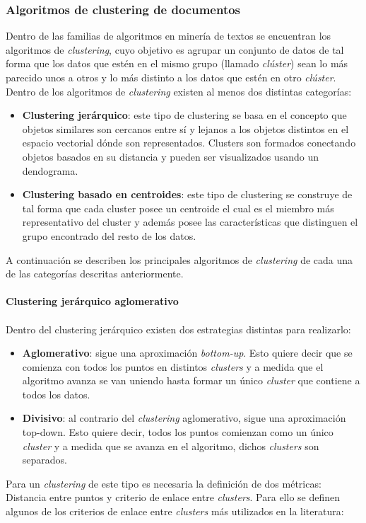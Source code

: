 \subsubsection{Algoritmos de clustering de documentos}
    Dentro de las familias de algoritmos en minería de textos se encuentran los algoritmos de \textit{clustering}, cuyo objetivo es agrupar un conjunto de datos de tal forma que los datos que estén en el mismo grupo (llamado \textit{clúster}) sean lo más parecido unos a otros y lo más distinto a los datos que estén en otro \textit{clúster}. Dentro de los algoritmos de \textit{clustering} existen al menos dos distintas categorías:
    \begin{itemize}
        \item \textbf{Clustering jerárquico}: este tipo de clustering se basa en el concepto que objetos similares son cercanos entre sí y lejanos a los objetos distintos en el espacio vectorial dónde son representados. Clusters son formados conectando objetos basados en su distancia y pueden ser visualizados usando un dendograma.
        
        \item \textbf{Clustering basado en centroides}: este tipo de clustering se construye de tal forma que cada cluster posee un centroide el cual es el miembro más representativo del cluster y además posee las características que distinguen el grupo encontrado del resto de los datos.
    \end{itemize}
    A continuación se describen los principales algoritmos de \textit{clustering} de cada una de las categorías descritas anteriormente.
\paragraph{Clustering jerárquico aglomerativo} 
\paragraph*{}Dentro del clustering jerárquico existen dos estrategias distintas para realizarlo:
    \begin{itemize}
        \item \textbf{Aglomerativo}: sigue una aproximación \textit{bottom-up}. Esto quiere decir que se comienza con todos los puntos en distintos \textit{clusters} y a medida que el algoritmo avanza se van uniendo hasta formar un único \textit{cluster} que contiene a todos los datos.
        \item \textbf{Divisivo}: al contrario del \textit{clustering} aglomerativo, sigue una aproximación top-down. Esto quiere decir, todos los puntos comienzan como un único \textit{cluster} y a medida que se avanza en el algoritmo, dichos \textit{clusters} son separados.
    \end{itemize}
    Para un \textit{clustering} de este tipo es necesaria la definición de dos métricas: Distancia entre puntos y criterio de enlace entre \textit{clusters}. Para ello se definen algunos de los criterios de enlace entre \textit{clusters} más utilizados en la literatura:
    

